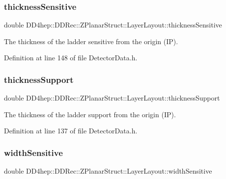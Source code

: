 \subsubsection{\texorpdfstring{thickness\+Sensitive}{thicknessSensitive}}
{\footnotesize\ttfamily double D\+D4hep\+::\+D\+D\+Rec\+::\+Z\+Planar\+Struct\+::\+Layer\+Layout\+::thickness\+Sensitive}



The thickness of the ladder sensitive from the origin (IP). 



Definition at line 148 of file Detector\+Data.\+h.

\hypertarget{struct_d_d4hep_1_1_d_d_rec_1_1_z_planar_struct_1_1_layer_layout_ad5631fa2c5ffb8e75433a14045b4db90}{}\label{struct_d_d4hep_1_1_d_d_rec_1_1_z_planar_struct_1_1_layer_layout_ad5631fa2c5ffb8e75433a14045b4db90} 
\subsubsection{\texorpdfstring{thickness\+Support}{thicknessSupport}}
{\footnotesize\ttfamily double D\+D4hep\+::\+D\+D\+Rec\+::\+Z\+Planar\+Struct\+::\+Layer\+Layout\+::thickness\+Support}



The thickness of the ladder support from the origin (IP). 



Definition at line 137 of file Detector\+Data.\+h.

\hypertarget{struct_d_d4hep_1_1_d_d_rec_1_1_z_planar_struct_1_1_layer_layout_ab19bdf088e4b8dc7549454825c9592c8}{}\label{struct_d_d4hep_1_1_d_d_rec_1_1_z_planar_struct_1_1_layer_layout_ab19bdf088e4b8dc7549454825c9592c8} 
\subsubsection{\texorpdfstring{width\+Sensitive}{widthSensitive}}
{\footnotesize\ttfamily double D\+D4hep\+::\+D\+D\+Rec\+::\+Z\+Planar\+Struct\+::\+Layer\+Layout\+::width\+Sensitive}



